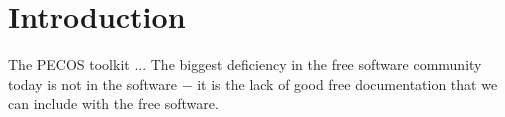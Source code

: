 \chapter{Introduction}\label{ch-int}
\thispagestyle{headings}

The PECOS toolkit ...
The biggest deficiency in the free software community today is not in the software $-$ it is the lack of good free documentation that we can include with the free software.
